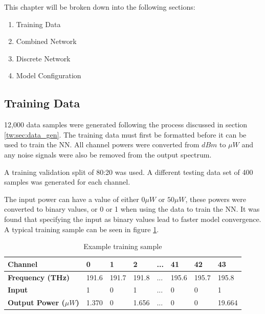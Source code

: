 This chapter will be broken down into the following sections:
\begin{enumerate}
    \item Training Data
    \item Combined Network
    \item Discrete Network
    \item Model Configuration
\end{enumerate}

\subsection{Training Data}\label{subsec:ml_model:data}
\FloatBarrier



12,000 data samples were generated following the process discussed in section \ref{tw:sec:data_gen}. The training data must first be formatted before it can be used to train the NN. %
All channel powers were converted from $dBm$ to $\mu W$ and any noise signals were also be removed from the output spectrum. 

A training validation split of 80:20 was used. A different testing data set of 400 samples was generated for each channel. 

The input power can have a value of either $0\mu W$ or $50 \mu W$, these powers were converted to binary values, or 0 or 1 when using the data to train the NN. It was found that specifying the input as binary values lead to faster model convergence.
A typical training sample can be seen in figure \ref{tab:ex_data_sample}.


\renewcommand{\arraystretch}{1.15}
\begin{table}[!h] 
    \centering
    \caption{Example training sample}
    
    \begin{tabular}[t]{l l l l l l l l }
        \textbf{Channel} & 0 & 1 & 2 & ... & 41 & 42 & 43 \\
        \hline
        \textbf{Frequency (THz)} & 191.6 & 191.7 & 191.8 & ... & 195.6 & 195.7 & 195.8 \\
        \hline
        \textbf{Input} & 1 & 0 & 1 & ... & 0 & 0 &	1 \\
        \hline
        \textbf{Output Power ($\mu W$)} & 1.370 & 0 & 1.656 & ... & 0 &	0 &	19.664 \\
        \hline
    \end{tabular}
    \label{tab:ex_data_sample}
\end{table}

